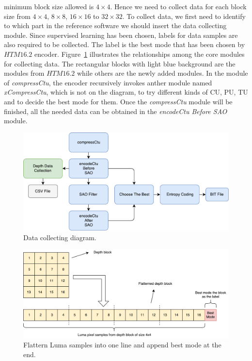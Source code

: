 minimum block size allowed is \(4\times4\).
Hence we need to collect data for each block size from 
\(4\times4\), \(8\times8\), \(16\times16\) to \(32\times32\).
To collect data, we first need to identify
to which part in the reference software
we should insert the data collecting module.
Since supervised learning has been chosen,
labels for data samples are also required to be collected.
The label is the best mode that has been chosen by \(HTM16.2\) encoder.
Figure~\ref{fig:data-collection-diagram} illustrates
the relationships among the core modules for collecting data.
The rectangular blocks with light blue background are the modules from
\(HTM16.2\) while others are the newly added modules.
In the module of \emph{compressCtu}, the encoder recursively invokes
anther module named \emph{xCompressCtu}, which is not on the diagram, to
try different kinds of CU, PU, TU and to decide the best mode for them.
Once the \emph{compressCtu} module will be finished, all the needed
data can be obtained in the \emph{encodeCtu Before SAO} module.
\begin{figure}
    \centering
    \includegraphics[width=\textwidth,height=\textheight,keepaspectratio]{Figures/thesis-data-collecting-diagram.pdf}
    \caption[Data collecting diagram]{Data collecting diagram.}
    \label{fig:data-collection-diagram}
\end{figure}
\begin{figure}
    \centering
    \includegraphics[width=\textwidth,height=\textheight,keepaspectratio]{Figures/flattern-pixels-into-single-line.pdf}
    \caption[Flattern Luma samples into one line and append best mode at the end]{Flattern Luma samples into one line and append best mode at the end.}\label{fig:flattern-data-into-one-dimension}
\end{figure}
